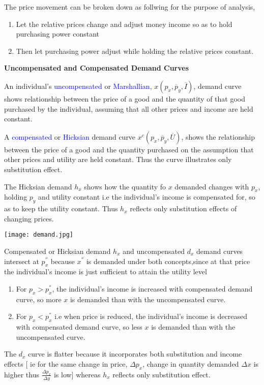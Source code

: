 \documentclass{tufte-handout}
\begin{document}
The price movement can be broken down as follwing for the purpose of analysis,
\begin{enumerate}
		\item Let the relative prices change and adjust money income so as to hold purchasing power constant
		\item Then let purchasing power adjust while holding the relative prices constant.
		
\end{enumerate}

\clearpage


\textbf{\centering \large Uncompensated and Compensated Demand Curves}\\ 
\vspace{0.5cm}

\textbullet An individual's \textcolor{blue}{uncompensated} or \textcolor{blue}{Marshallian}, $x(p_x,\overline{p}_y,\overline{I})$,  demand curve shows relationship between the price of a good and the quantity of that good purchased by the individual, assuming that all other prices and income are held constant.

\textbullet A \textcolor{blue}{compensated} or \textcolor{blue}{Hicksian} demand curve  $x^c(p_x,\overline{p}_y,\overline{U})$, shows the relationship between the price of a good and the quantity purchased on the assumption that other prices and utility are held constant. Thus the curve illustrates only substitution effect.



The Hicksian demand $h_x$ shows how the quantity fo  $x$ demanded changes with  $p_x$, holding  $p_y$ and utility constant i.e the individual's income is compensated for, so as to keep the utility constant. Thus  $h_x$ reflects only substitution effects of changing prices.



\begin{marginfigure} %
    \texttt{[image: demand.jpg]}
\end{marginfigure}
Compensated or Hicksian demand $h_x$ and uncompensated  $d_x$ demand curves intersect at  $p_x^{''}$ because  $x^{''}$ is demanded under both concepts,since at that price the individual's income is just sufficient to attain the utility level
\begin{enumerate}
	\item For $p_x > p_x^{''}$, the individual's income is increased with compensated demand curve, so  more $x$ is demanded than with the uncompensated curve. 
	\item For $p_x < p_x^{''}$ i.e when price is reduced, the individual's income is decreased with compensated demand curve, so less  $x$ is demanded than with the uncompensated curve.
\end{enumerate}
The $d_x$ curve is flatter because it incorporates both substitution and income effects [ ie for the same change in price, $\Delta p_x$, change in quantity demanded $\Delta x$ is higher thus  
$\frac{\Delta p_x}{\Delta y} $ is low]  whereas  $h_x$ reflects only substitution effect.
\end{document}
